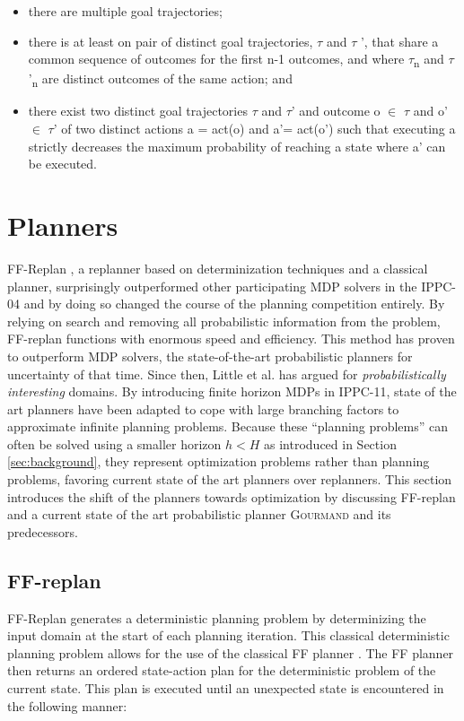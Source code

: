 \documentclass[runningheads,a4paper]{llncs}
\begin{document}
\begin{itemize}
	\item there are multiple goal trajectories;
	\item there is at least on pair of distinct goal trajectories, $\tau$ and $\tau$ ', that share a common sequence of outcomes for the first n-1 outcomes, and where $\tau$\textsubscript{n} and $\tau$'\textsubscript{n} are distinct outcomes of the same action; and
	\item there exist two distinct goal trajectories $\tau$ and $\tau$' and outcome o $\in$ $\tau$ and o' $\in$ $\tau$' of two distinct actions a = act(o) and a'= act(o') such that executing a strictly decreases the maximum probability of reaching a state where a' can be executed.
\end{itemize}


\section{Planners}
\label{sec:planners}

FF-Replan \cite{FFReplan}, a replanner based on determinization techniques and a classical planner, surprisingly outperformed other participating MDP solvers in the IPPC-04 and by doing so changed the course of the planning competition entirely. By relying on search and removing all probabilistic information from the problem, FF-replan functions with enormous speed and efficiency. This method has proven to outperform MDP solvers, the state-of-the-art probabilistic planners for uncertainty of that time. Since then, Little et al. has argued for \emph{probabilistically interesting} domains. By introducing finite horizon MDPs in IPPC-11, state of the art planners have been adapted to cope with large branching factors to approximate infinite planning problems. Because these ``planning problems'' can often be solved using a smaller horizon $h < H$ as introduced in Section \ref{sec:background}, they represent optimization problems rather than planning problems, favoring current state of the art planners over replanners. This section introduces the shift of the planners towards optimization  by discussing FF-replan and a current state of the art probabilistic planner \textsc{Gourmand} and its predecessors.

\subsection{FF-replan}
\label{sec:ffreplan}
 FF-Replan generates a deterministic planning problem by determinizing the input domain at the start of each planning iteration. This classical deterministic planning problem allows for the use of the classical FF planner \cite{Hoffmann01theff}. The FF planner then returns an ordered state-action plan for the deterministic problem of the current state. This plan is executed until an unexpected state is encountered in the following manner:
\end{document}
